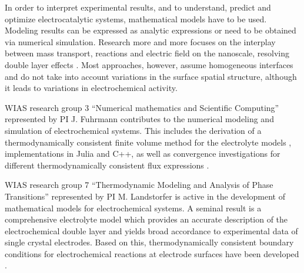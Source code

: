 \documentclass[a4paper,10pt]{article}
\begin{document}
In order to interpret experimental results, and to understand, predict and optimize electrocatalytic systems, mathematical models have to be used.
Modeling results can be expressed as analytic expressions or need to be obtained via numerical simulation.
Research more and more focuses on the interplay between mass transport, reactions and  electric field on the nanoscale, resolving double layer effects \cite{lin2019understanding,tan2018double,eden2019modeling,bohra2019modeling}. Most approaches, however, assume homogeneous interfaces  and do not take into account variations in the surface spatial structure, although it
leads to variations in electrochemical activity.


WIAS research group 3 ``Numerical mathematics and Scientific Computing'' represented by PI J. Fuhrmann contributes to the numerical modeling and simulation of electrochemical systems. This includes  the derivation of a thermodynamically consistent finite volume method \cite{JF2016} for the electrolyte models \cite{DGL2014,VagnerEtAl2019}, implementations in Julia and C++, as well as convergence investigations for  different thermodynamically consistent flux expressions \cite{CCFG2020}.   %

WIAS research group 7 ``Thermodynamic Modeling and Analysis of Phase Transitions'' represented by PI M. Landstorfer is active in the development of mathematical models for electrochemical systems.  A seminal result is a comprehensive electrolyte model which provides an accurate description of the electrochemical double layer and yields broad accordance to experimental data of single crystal electrodes. Based on this, thermodynamically consistent boundary conditions for electrochemical reactions at electrode surfaces have been developed \cite{DGM2013,DGL2014,Landstorfer2016187,landstorfer2017boundary}.
\end{document}
